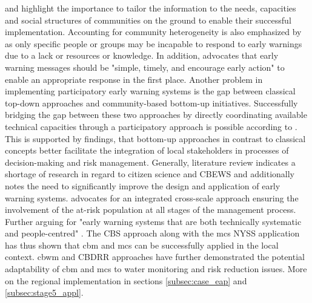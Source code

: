 \autocite{gladfelterPoliticsParticipationCommunitybased2018,inayathEARLYWARNINGSYSTEM2018} and \autocite{trogrlicIndigenousKnowledgeEarly2018} highlight the importance to tailor the information to the needs, capacities and social structures of communities on the ground to enable their successful implementation. Accounting for community heterogeneity is also emphasized by \autocite{gladfelterPoliticsParticipationCommunitybased2018} as only specific people or groups may be incapable to respond to early warnings due to a lack or resources or knowledge. In addition, \autocite[21]{inayathEARLYWARNINGSYSTEM2018} advocates that early warning messages should be "simple, timely, and encourage early action" to enable an appropriate response in the first place.\newline
Another problem in implementing participatory early warning systems is the gap between classical top-down approaches and community-based bottom-up initiatives. Successfully bridging the gap between these two approaches by directly coordinating available technical capacities through a participatory approach is possible according to \autocite{tarchianiCommunityImpactBased2020}. This is supported by \autocite{henriksenParticipatoryEarlyWarning2018} findings, that bottom-up approaches in contrast to classical concepts better facilitate the integration of local stakeholders in processes of decision-making and risk management. Generally, \autocite{marcheziniReviewStudiesParticipatory2018} literature review indicates a shortage of research in regard to citizen science and CBEWS and \autocite{baudoinEarlyWarningSystems2014} additionally notes the need to significantly improve the design and application of early warning systems. \autocite{baudoinEarlyWarningSystems2014} advocates for an integrated cross-scale approach ensuring the involvement of the at-risk population at all stages of the management process. Further arguing for "early warning systems that are both technically systematic and people-centred" \autocite[15]{baudoinEarlyWarningSystems2014}.\newline
The CBS approach along with the \acrshort{mcs} NYSS application has thus shown that \acrshort{cbm} and \acrshort{mcs} can be successfully applied in the local context. \acrshort{cbwm} and CBDRR approaches have further demonstrated the potential adaptability of \acrshort{cbm} and \acrshort{mcs} to water monitoring and risk reduction issues. More on the regional implementation in sections \ref{subsec:case_eap} and \ref{subsec:stage5_appl}.

